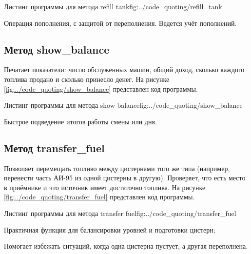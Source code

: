 \documentclass{vvsu}
\begin{document}
\begin{vvsu_figure}{Листинг программы для метода refill tank}{fig:../code_quoting/refill_tank}
  \begin{minipage}{.75\textwidth}
    
  \end{minipage}
\end{vvsu_figure}

  Операция пополнения, с защитой от переполнения. Ведется учёт пополнений.


\subsection{Метод show\_balance}
  Печатает показатели: число обслуженных машин, общий доход, сколько каждого топлива продано и сколько принесло денег.
  На рисунке \ref{fig:../code_quoting/show_balance} представлен код программы.

\begin{vvsu_figure}{Листинг программы для метода show balance}{fig:../code_quoting/show_balance}
  \begin{minipage}{.75\textwidth}
    
  \end{minipage}
\end{vvsu_figure}

  Быстрое подведение итогов работы смены или дня.


\subsection{Метод transfer\_fuel}
  Позволяет перемещать топливо между цистернами того же типа (например, перенести часть АИ-95 из одной цистерны в другую). Проверяет, что есть место в приёмнике и что источник имеет достаточно топлива.
  На рисунке \ref{fig:../code_quoting/transfer_fuel} представлен код программы.

\begin{vvsu_figure}{Листинг программы для метода transfer fuel}{fig:../code_quoting/transfer_fuel}
  \begin{minipage}{.75\textwidth}
    
  \end{minipage}
\end{vvsu_figure}
\begin{vvsu_itemize}
  \item Практичная функция для балансировки уровней и подготовки цистерн;
  \item Помогает избежать ситуаций, когда одна цистерна пустует, а другая переполнена.
\end{vvsu_itemize}
\end{document}
